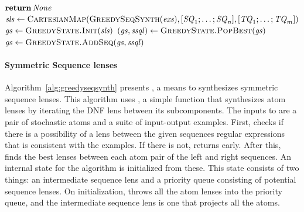 \documentclass[acmsmall,screen,anonymous]{acmart}
\begin{document}
\begin{algorithm}
  \caption{\GreedySynth}
  \label{alg:greedysynth}
  \begin{algorithmic}[1]
    \State $\ReturnVal{\None}$
    \EndIf
    \State $\SLS \gets
    \Call{\CartesianMap}{\GreedySeqSynth(\Examples),\ListOf{\Sequence_1;\ldots;\Sequence_n},\ListOf{\SequenceAlt_1;\ldots;\SequenceAlt_m}}$
    \State $\GreedyState \gets \Call{GreedyState.Init}{\SLS}$
    \State $(\GreedyState,\SSQLens) \gets
    \Call{GreedyState.PopBest}{\GreedyState}$
    \State $\GreedyState \gets \Call{GreedyState.AddSeq}{\GreedyState,\SSQLens}$
    \EndIf
    \EndWhile
    \EndFunction
  \end{algorithmic}
\end{algorithm}

\paragraph*{Symmetric Sequence lenses} Algorithm~\ref{alg:greedyseqsynth}
presents \GreedySeqSynth, a means to synthesizes symmetric sequence lenses. This
algorithm uses , a simple function that synthesizes atom lenses
by iterating the DNF lens between its subcomponents. The inputs to
\GreedySeqSynth are a pair of stochastic atoms and a suite of input-output
examples. First,  checks if there is a possibility of a lens
between the given sequences regular expressions that is consistent with the
examples. If there is not, \GreedySeqSynth returns \None early. After this,
\GreedySeqSynth finds the best lenses between each atom pair of the left and
right sequences. An internal state for the algorithm is initialized from these.
This state consists of two things: an intermediate sequence lens and a priority
queue consisting of potential sequence lenses. On initialization,
\GreedySeqSynth throws all the atom lenses into the priority queue, and the
intermediate sequence lens is one that projects all the atoms.
\end{document}
